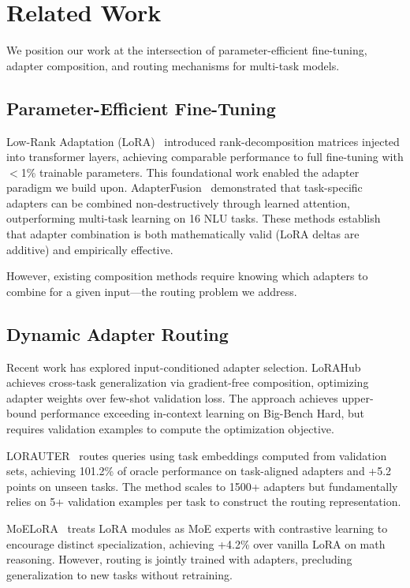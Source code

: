 \section{Related Work}
\label{sec:related}

We position our work at the intersection of parameter-efficient fine-tuning, adapter composition, and routing mechanisms for multi-task models.

\subsection{Parameter-Efficient Fine-Tuning}

Low-Rank Adaptation (LoRA)~\cite{hu2021lora} introduced rank-decomposition matrices injected into transformer layers, achieving comparable performance to full fine-tuning with $<$1\% trainable parameters. This foundational work enabled the adapter paradigm we build upon. AdapterFusion~\cite{pfeiffer2021adapterfusion} demonstrated that task-specific adapters can be combined non-destructively through learned attention, outperforming multi-task learning on 16 NLU tasks. These methods establish that adapter combination is both mathematically valid (LoRA deltas are additive) and empirically effective.

However, existing composition methods require knowing which adapters to combine for a given input---the routing problem we address.

\subsection{Dynamic Adapter Routing}

Recent work has explored input-conditioned adapter selection. LoRAHub~\cite{huang2023lorahub} achieves cross-task generalization via gradient-free composition, optimizing adapter weights over few-shot validation loss. The approach achieves upper-bound performance exceeding in-context learning on Big-Bench Hard, but requires validation examples to compute the optimization objective.

LORAUTER~\cite{dhasade2026lorauter} routes queries using task embeddings computed from validation sets, achieving 101.2\% of oracle performance on task-aligned adapters and +5.2 points on unseen tasks. The method scales to 1500+ adapters but fundamentally relies on 5+ validation examples per task to construct the routing representation.

MoELoRA~\cite{luo2024moelora} treats LoRA modules as MoE experts with contrastive learning to encourage distinct specialization, achieving +4.2\% over vanilla LoRA on math reasoning. However, routing is jointly trained with adapters, precluding generalization to new tasks without retraining.

